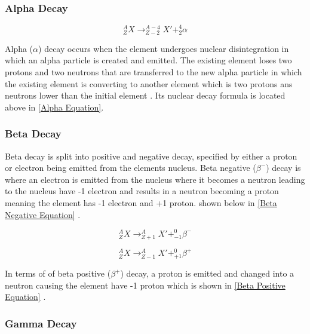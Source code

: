 \subsubsection*{Alpha Decay}
\label{Alpha Decay SubSubSection}

\begin{equation}
{^A_ZX \rightarrow ^{A-4}_{Z-2}X' + ^4_2\alpha}
\label{Alpha Equation}
\end{equation} 
\vspace{0.2cm}

Alpha ($\alpha$) decay occurs when the element undergoes nuclear disintegration in which an alpha particle is created and emitted. The existing element loses two protons and two neutrons that are transferred to the new alpha particle in which the existing element is converting to another element which is two protons ans neutrons lower than the initial element \cite{Decay} \cite{Decay1}. Its nuclear decay formula is located above in \cref{Alpha Equation}.

\subsubsection*{Beta Decay}
\label{Beta Decay SubSubSection}

Beta decay is split into positive and negative decay, specified by either a proton or electron being emitted from the elements nucleus. Beta negative ($\beta^-$) decay is where an electron is emitted from the nucleus where it becomes a neutron leading to the nucleus have -1 electron and results in a neutron becoming a proton meaning the element has -1 electron and +1 proton. shown below in \cref{Beta Negative Equation} \cite{Decay} \cite{Decay1}.

\begin{equation}
{^A_ZX \rightarrow ^{A}_{Z+1}X' + ^0_{-1}\beta^{-}}
\label{Beta Negative Equation}
\end{equation} 

\begin{equation}
{^A_ZX \rightarrow ^{A}_{Z-1}X' + ^0_{+1}\beta^{+}}
\label{Beta Positive Equation}
\end{equation} 
\vspace{0.2cm}

In terms of of beta positive ($\beta^+$) decay, a proton is emitted and changed into a neutron causing the element have -1 proton which is shown in \cref{Beta Positive Equation} \cite{Decay1}.

\subsubsection*{Gamma Decay}
\label{Gamma Decay SubSubSection}

